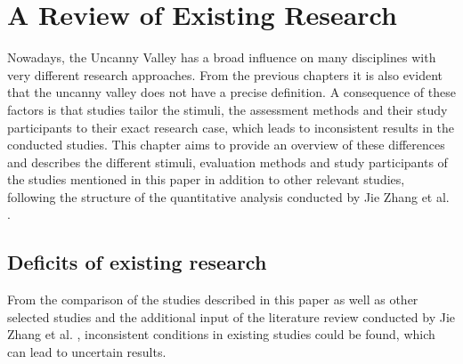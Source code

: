 \chapter{A Review of Existing Research}
Nowadays, the Uncanny Valley has a broad influence on many disciplines with very different research approaches. From the previous chapters it is also evident that the uncanny valley does not have a precise definition. A consequence of these factors is that studies tailor the stimuli, the assessment methods and their study participants to their exact research case, which leads to inconsistent results in the conducted studies. 
This chapter aims to provide an overview of these differences and describes the different stimuli, evaluation methods and study participants of the studies mentioned in this paper in addition to other relevant studies, following the structure of the quantitative analysis conducted by Jie Zhang et al. \cite{quant_review}.

 \section{Deficits of existing research}
 From the comparison of the studies described in this paper as well as other selected studies and the additional input of the literature review conducted by Jie Zhang et al. \cite{quant_review}, inconsistent conditions in existing studies could be found, which can lead to uncertain results. 

